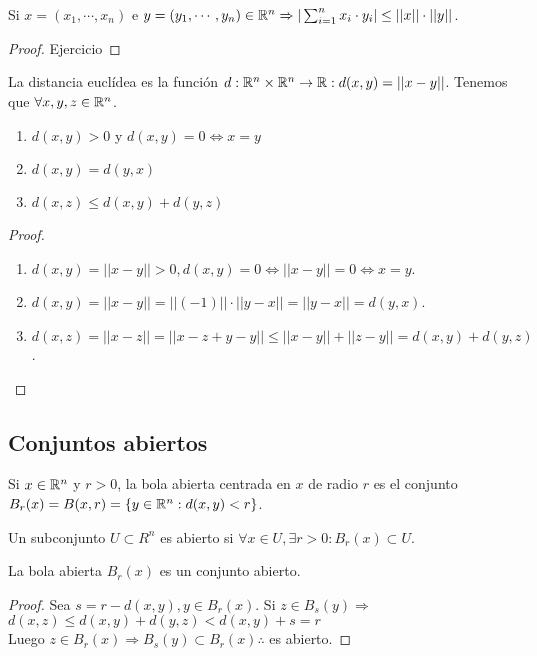 \begin{prop}
  Si $x = (x_1, \cdots, x_n)$ e $y = (y_1, \cdots, y_n) \in \mathbb{R}^n \Rightarrow | \sum_{i = 1}^n x_i \cdot y_i | \leq ||x|| \cdot ||y||$.
  \begin{proof}
    Ejercicio
  \end{proof}
\end{prop}

\begin{definition}
  La distancia euclídea es la función $d: \mathbb{R}^n \times \mathbb{R}^n \to \mathbb{R} : d(x, y) = ||x-y||$.
  Tenemos que $\forall x,y,z \in \mathbb{R}^n$.
  \begin{enumerate}
    \item $d(x, y) > 0$ y $d(x, y) = 0 \iff x=y$
    \item $d(x, y) = d(y, x)$
    \item $d(x, z) \leq d(x, y) + d(y, z)$
  \end{enumerate}
  \begin{proof}
    \begin{enumerate}
      \item $d(x, y) = ||x-y|| > 0, d(x, y) = 0 \iff ||x-y|| = 0 \iff x = y$.
      \item $d(x, y) = ||x-y|| = ||(-1)|| \cdot ||y-x|| = ||y-x|| = d(y, x)$.
      \item $d(x, z) = ||x-z|| = ||x-z+y-y|| \leq ||x-y|| + ||z-y|| = d(x, y) + d(y, z)$.
    \end{enumerate}
  \end{proof}
\end{definition}

\subsection{Conjuntos abiertos}
\begin{definition}
  Si $x \in \mathbb{R}^n$ y $r > 0$, la bola abierta centrada en $x$ de radio $r$ es el conjunto $B_r(x) = B(x,r) = \{ y \in \mathbb{R}^n : d(x, y) < r \}$. 
\end{definition}

\begin{definition}
  Un subconjunto $U \subset R^n$ es abierto si $\forall x \in U, \exists r > 0 : B_r(x) \subset U$.
\end{definition}

\begin{lemma}
  La bola abierta $B_r(x)$ es un conjunto abierto.
  \begin{proof}
    Sea $s = r - d(x, y), y \in B_r(x)$. Si $z \in B_s(y) \Rightarrow$ \\
    $d(x, z) \leq d(x, y) + d(y, z) < d(x, y) + s = r$ \\
    Luego $z \in B_r(x) \Rightarrow B_s(y) \subset B_r(x) \therefore$ es abierto.
  \end{proof}
\end{lemma}

